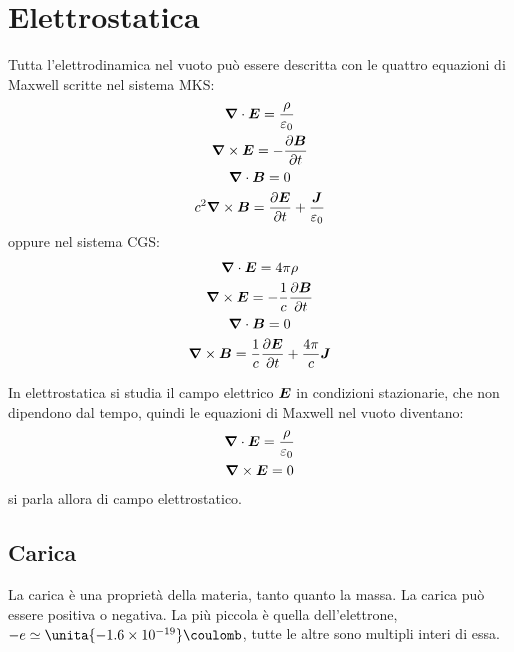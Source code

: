 \chapter{Elettrostatica}
\minitoc
Tutta l'elettrodinamica nel vuoto può essere descritta con le quattro equazioni di Maxwell
 scritte nel sistema MKS:
\begin{subequations}
\begin{gather}
\boldsymbol{\nabla}\cdot\boldsymbol{E}=\frac{\rho}{\varepsilon_0}\\
\boldsymbol{\nabla}\times\boldsymbol{E}=-\frac{\partial \boldsymbol{B}}{\partial t}\\
\boldsymbol{\nabla} \cdot \boldsymbol{B}=0\\
c^2\boldsymbol{\nabla}\times \boldsymbol{B}=\frac{\partial \boldsymbol{E}}{\partial t}+\frac{\boldsymbol{J}}{\varepsilon_0}
\end{gather}
\end{subequations}
oppure nel sistema CGS:
\begin{subequations}
 \begin{gather}
  \boldsymbol{\nabla}\cdot\boldsymbol{E}=4\pi\rho\\
  \boldsymbol{\nabla}\times\boldsymbol{E}=-\frac{1}{c}\frac{\partial \boldsymbol{B}}{\partial t}\\
  \boldsymbol{\nabla} \cdot \boldsymbol{B}=0\\
  \boldsymbol{\nabla}\times \boldsymbol{B}=\frac{1}{c}\frac{\partial \boldsymbol{E}}{\partial t}+\frac{4\pi}{c}\boldsymbol{J}
 \end{gather}
\end{subequations}

In elettrostatica si studia il campo elettrico $\boldsymbol{E}$ in condizioni stazionarie, che non dipendono dal tempo, quindi le equazioni di Maxwell nel vuoto diventano:
\begin{subequations}
\begin{gather}
\boldsymbol{\nabla}\cdot\boldsymbol{E}=\frac{\rho}{\varepsilon_0}\\
\boldsymbol{\nabla}\times\boldsymbol{E}=0
\end{gather}
\end{subequations}
si parla allora di campo elettrostatico.
\section{Carica}
La carica è una proprietà della materia, tanto quanto la massa. La carica può essere positiva o negativa. La più piccola è quella dell'elettrone, $-e\simeq\unita{-1.6\times 10^{-19}}\coulomb$, tutte le altre sono multipli interi di essa.
